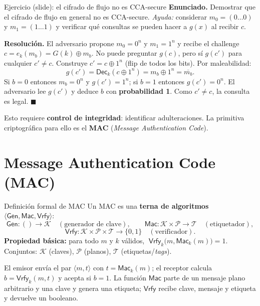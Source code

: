 \documentclass[11pt,a4paper]{article}
\newcommand{\Kset}{\mathcal{K}}
\newcommand{\Pset}{\mathcal{P}}
\newcommand{\Tset}{\mathcal{T}}
\newcommand{\xor}{\oplus}
\newcommand{\Mac}{\mathsf{Mac}}
\newcommand{\Vrfy}{\mathsf{Vrfy}}
\newcommand{\Gen}{\mathsf{Gen}}
\newcommand{\Dec}{\mathsf{Dec}}
\begin{document}
\begin{practbox}{Ejercicio (slide): el cifrado de flujo no es CCA-secure}
\textbf{Enunciado.} Demostrar que el cifrado de flujo en general no es CCA-secure.
\emph{Ayuda:} considerar $m_0=(0\ldots0)$ y $m_1=(1\ldots1)$ y verificar qué consultas se
pueden hacer a $g(x)$ al recibir $c$.

\medskip
\textbf{Resolución.} El adversario propone $m_0=0^n$ y $m_1=1^n$ y recibe el challenge
$c=e_k(m_b)=G(k)\xor m_b$. No puede preguntar $g(c)$, pero sí $g(c')$ para cualquier
$c'\neq c$. Construye $c'=c\xor 1^n$ (flip de todos los bits). Por maleabilidad:
\[
  g(c')=\Dec_k(c\xor 1^n)=m_b\xor 1^n=\overline{m_b}.
\]
Si $b=0$ entonces $m_b=0^n$ y $g(c')=1^n$; si $b=1$ entonces $g(c')=0^n$. El adversario lee
$g(c')$ y deduce $b$ con \textbf{probabilidad 1}. Como $c'\neq c$, la consulta es legal.
$\blacksquare$
\end{practbox}

Esto requiere \textbf{control de integridad}: identificar adulteraciones. La primitiva
criptográfica para ello es el \textbf{MAC} (\emph{Message Authentication Code}).

\section{Message Authentication Code (MAC)}

\begin{defbox}{Definición formal de MAC}
Un MAC es una \textbf{terna de algoritmos} $\langle\Gen,\Mac,\Vrfy\rangle$:
\[
  \Gen:()\to\Kset \quad(\text{generador de clave}),\qquad
  \Mac:\Kset\times\Pset\to\Tset \quad(\text{etiquetador}),
\]
\[
  \Vrfy:\Kset\times\Pset\times\Tset\to\{0,1\} \quad(\text{verificador}).
\]
\textbf{Propiedad básica:} para todo $m$ y $k$ válidos,
$\;\Vrfy_k\bigl(m,\Mac_k(m)\bigr)=1$.\\
Conjuntos: $\Kset$ (claves), $\Pset$ (planos), $\Tset$ (etiquetas/\emph{tags}).
\end{defbox}

El emisor envía el par $\langle m,t\rangle$ con $t=\Mac_k(m)$; el receptor calcula
$b=\Vrfy_k(m,t)$ y acepta si $b=1$. La función $\Mac$ parte de un mensaje plano arbitrario y
una clave y genera una etiqueta; $\Vrfy$ recibe clave, mensaje y etiqueta y devuelve un
booleano.
\end{document}
